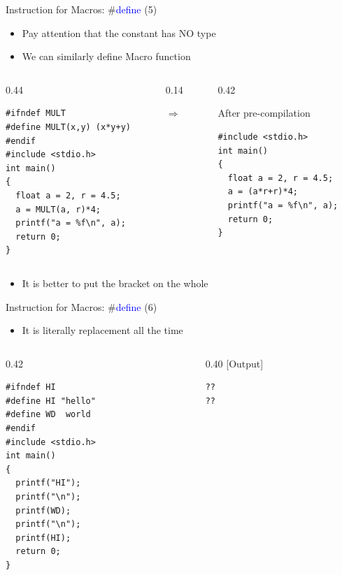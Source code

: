 \begin{frame}[fragile]{Instruction for Macros: \#\textcolor{blue}{define} (5)}
\begin{itemize}
	\item {Pay attention that the constant has NO type}
	\item {We can similarly define Macro function}
\end{itemize}
\begin{columns}
\begin{column}{0.44\linewidth}
\begin{lstlisting}[xleftmargin=0.05\linewidth]
#ifndef MULT
#define MULT(x,y) (x*y+y)
#endif
#include <stdio.h>
int main()
{
  float a = 2, r = 4.5;
  a = MULT(a, r)*4;
  printf("a = %f\n", a);
  return 0;
}
\end{lstlisting}
\end{column}
\begin{column}{0.14\linewidth}
\begin{center}
\vspace{0.6in}
$\Longrightarrow$
\end{center}
\end{column}
\begin{column}{0.42\linewidth}
\begin{block}{After pre-compilation}
\end{block} 
\begin{lstlisting}
#include <stdio.h>
int main()
{
  float a = 2, r = 4.5;
  a = (a*r+r)*4;
  printf("a = %f\n", a);
  return 0;
}
\end{lstlisting}
\end{column}
\end{columns}
\begin{itemize}
	\item {It is better to put the bracket on the whole}
\end{itemize}
\end{frame}

\begin{frame}[fragile]{Instruction for Macros: \#\textcolor{blue}{define} (6)}
\begin{itemize}
	\item {It is literally replacement all the time}
\end{itemize}
\begin{columns}
\begin{column}{0.42\linewidth}
\begin{lstlisting}
#ifndef HI
#define HI "hello"
#define WD	world
#endif
#include <stdio.h>
int main()
{
  printf("HI");
  printf("\n");
  printf(WD);
  printf("\n");
  printf(HI);
  return 0;
}
\end{lstlisting}
\end{column}
\begin{column}{0.40\linewidth}
[Output]
\begin{lstlisting}
??
??
\end{lstlisting}
\end{column}
\end{columns}
\end{frame}

